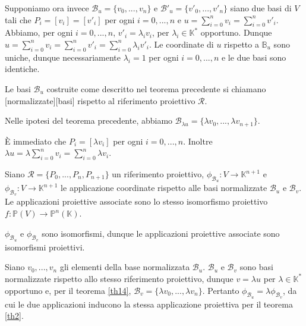 	\par Supponiamo ora invece $\mathcal{B}_u = \lbrace v_0, ..., v_n \rbrace$ e $\mathcal{B}'_u = \lbrace v'_0, ..., v'_n \rbrace$ siano due basi di $V$ tali che $P_i = [v_i] = [v'_i]$ per ogni $i = 0, ..., n$ e $u = \sum_{i = 0}^n v_i = \sum_{i = 0}^n v'_i$. Abbiamo, per ogni $i = 0, ..., n$, $v'_i = \lambda_i v_i$, per $\lambda_i \in \mathbb{K}^*$ opportuno. Dunque $u = \sum_{i = 0}^n v_i = \sum_{i = 0}^n v'_i = \sum_{i = 0}^n \lambda_i v'_i$. Le coordinate di $u$ rispetto a $\mathbb{B}_u$ sono uniche, dunque necessariamente $\lambda_i = 1$ per ogni $i = 0, ..., n$ e le due basi sono identiche. \EndProof
\begin{Definition}\label{def16}
	Le basi $\mathcal{B}_u$ costruite come descritto nel teorema precedente si chiamano [normalizzate][basi] rispetto al riferimento proiettivo $\mathcal{R}$.
\end{Definition}
\begin{Theorem}\label{th14}
	Nelle ipotesi del teorema precedente, abbiamo $\mathcal{B}_{\lambda u} = \lbrace \lambda v_0, ..., \lambda v_{n + 1} \rbrace$.
\end{Theorem}
\Proof \`E immediato che $P_i = [\lambda v_i]$ per ogni $i = 0, ..., n$. Inoltre $\lambda u = \lambda \sum_{i = 0}^n v_i = \sum_{i = 0}^n \lambda v_i$. \EndProof
\begin{Theorem}\label{th15}
	Siano $\mathcal{R} = \lbrace P_0, ..., P_n, P_{n + 1} \rbrace$ un riferimento proiettivo, $\phi_{\mathcal{B}_u}: V \rightarrow \mathbb{K}^{n + 1}$ e $\phi_{\mathcal{B}_v}: V \rightarrow \mathbb{K}^{n + 1}$ le applicazione coordinate rispetto alle basi normalizzate $\mathcal{B}_u$ e $\mathcal{B}_v$. Le applicazioni proiettive associate sono lo stesso isomorfismo proiettivo $f: \mathbb{P}(V) \rightarrow \mathbb{P}^n(\mathbb{K})$.
\end{Theorem}
\Proof $\phi_{\mathcal{B}_u}$ e $\phi_{\mathcal{B}_v}$ sono isomorfismi, dunque le applicazioni proiettive associate sono isomorfismi proiettivi.
	\par Siano $v_0, ..., v_n$ gli elementi della base normalizzata $\mathcal{B}_u$. $\mathcal{B}_u$ e $\mathcal{B}_v$ sono basi normalizzate rispetto allo stesso riferimento proiettivo, dunque $v = \lambda u$ per $\lambda \in \mathbb{K}^*$ opportuno e, per il teorema \ref{th14}, $\mathcal{B}_v = \lbrace \lambda v_0, ..., \lambda v_n \rbrace$. Pertanto $\phi_{\mathcal{B}_u} = \lambda \phi_{\mathcal{B}_v}$, da cui le due applicazioni inducono la stessa applicazione proiettiva per il teorema \ref{th2}. \EndProof
